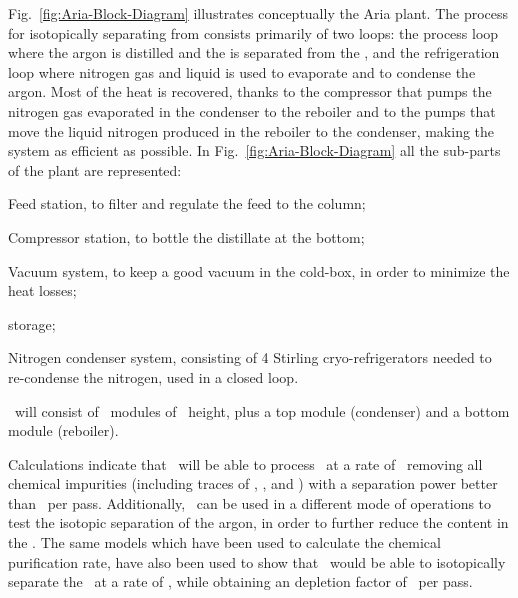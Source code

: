 Fig.~\ref{fig:Aria-Block-Diagram} illustrates conceptually the Aria plant. The process for isotopically separating  from  consists primarily of two loops: the process loop where the argon is distilled and the  is separated from the , and the refrigeration loop where nitrogen gas and liquid is used to evaporate and to condense the argon. Most of the heat is recovered, thanks to the compressor that pumps the nitrogen gas evaporated in the condenser to the reboiler and to the pumps that move the liquid nitrogen produced in the reboiler to the condenser, making the system as efficient as possible.  In Fig.~\ref{fig:Aria-Block-Diagram} all the sub-parts of the plant are represented:
\begin{compactitem}
\item Feed station, to filter and regulate the feed to the column;
\item Compressor station, to bottle the distillate at the bottom;
\item Vacuum system, to keep a good vacuum in the cold-box, in order to minimize the heat losses;
\item {} storage;
\item Nitrogen condenser system, consisting of 4 Stirling cryo-refrigerators needed to re-condense the nitrogen, used in a closed loop.
\end{compactitem}

\SeruciOne\ will consist of \AriaCentralModulesNumber\ modules of \AriaCentralModulesHeight\ height, plus a top module (condenser) and a bottom module (reboiler).

Calculations indicate that \SeruciOne\ will be able to process \UAr\ at a rate of \AriaChemicalRate\ removing all chemical impurities (including traces of , , and ) with a separation power better than \AriaChemicalPerPass\ per pass.  Additionally, \SeruciOne\ can be used in a different mode of operations to test the isotopic separation of the argon, in order to further reduce the  content in the \UAr.  The same models which have been used to calculate the chemical purification rate, have also been used to show that \SeruciOne\ would be able to isotopically separate the \UAr\ at a rate of \AriaSeruciOneRate, while obtaining an  depletion factor of \AriaDepletionPerPass\ per pass. 


